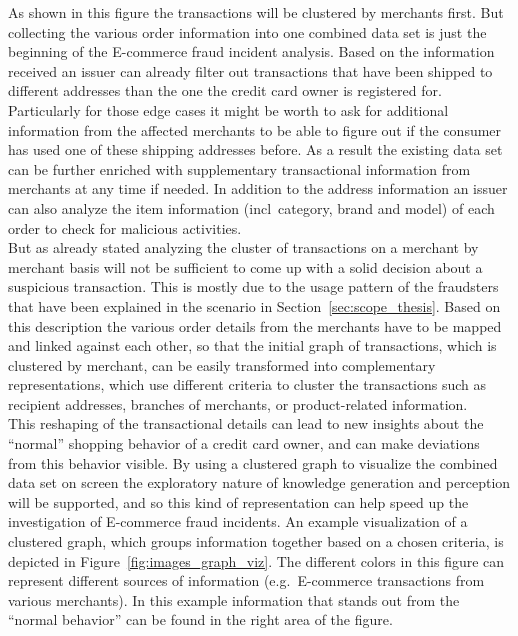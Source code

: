 As shown in this figure the transactions will be clustered by merchants first. But collecting the various order information into one combined data set is just the beginning of the \gls{E-commerce} fraud incident analysis. Based on the information received an issuer can already filter out transactions that have been shipped to different addresses than the one the credit card owner is registered for. Particularly for those edge cases it might be worth to ask for additional information from the affected merchants to be able to figure out if the consumer has used one of these shipping addresses before. As a result the existing data set can be further enriched with supplementary transactional information from merchants at any time if needed. In addition to the address information an issuer can also analyze the item information (\gls{incl}\ category, brand and model) of each order to check for malicious activities. \\

But as already stated analyzing the cluster of transactions on a merchant by merchant basis will not be sufficient to come up with a solid decision about a suspicious transaction. This is mostly due to the usage pattern of the fraudsters that have been explained in the scenario in Section~\ref{sec:scope_thesis}. Based on this description the various order details from the merchants have to be mapped and linked against each other, so that the initial graph of transactions, which is clustered by merchant, can be easily transformed into complementary representations, which use different criteria to cluster the transactions such as recipient addresses, branches of merchants, or product-related information. \\

This reshaping of the transactional details can lead to new insights about the ``normal'' shopping behavior of a credit card owner, and can make deviations from this behavior visible. By using a clustered graph to visualize the combined data set on screen the exploratory nature of knowledge generation and perception will be supported, and so this kind of representation can help speed up the investigation of \gls{E-commerce} fraud incidents. An example visualization of a clustered graph, which groups information together based on a chosen criteria, is depicted in Figure~\ref{fig:images_graph_viz}. The different colors in this figure can represent different sources of information (e.g.\ \gls{E-commerce} transactions from various merchants). In this example information that stands out from the ``normal behavior'' can be found in the  right area of the figure. \@

